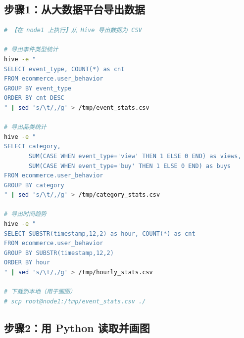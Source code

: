 \documentclass[12pt,a4paper]{article}
\begin{document}
\subsection{步骤1：从大数据平台导出数据}

\begin{lstlisting}[language=bash]
# 【在 node1 上执行】从 Hive 导出数据为 CSV

# 导出事件类型统计
hive -e "
SELECT event_type, COUNT(*) as cnt
FROM ecommerce.user_behavior
GROUP BY event_type
ORDER BY cnt DESC
" | sed 's/\t/,/g' > /tmp/event_stats.csv

# 导出品类统计
hive -e "
SELECT category,
       SUM(CASE WHEN event_type='view' THEN 1 ELSE 0 END) as views,
       SUM(CASE WHEN event_type='buy' THEN 1 ELSE 0 END) as buys
FROM ecommerce.user_behavior
GROUP BY category
" | sed 's/\t/,/g' > /tmp/category_stats.csv

# 导出时间趋势
hive -e "
SELECT SUBSTR(timestamp,12,2) as hour, COUNT(*) as cnt
FROM ecommerce.user_behavior
GROUP BY SUBSTR(timestamp,12,2)
ORDER BY hour
" | sed 's/\t/,/g' > /tmp/hourly_stats.csv

# 下载到本地（用于画图）
# scp root@node1:/tmp/event_stats.csv ./
\end{lstlisting}

\subsection{步骤2：用 Python 读取并画图}
\end{document}
